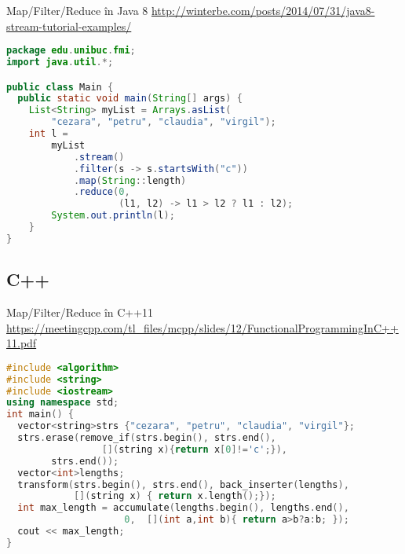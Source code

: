\documentclass[handout,xcolor=pdftex,romanian,colorlinks]{beamer}
\begin{document}
\begin{frame}[fragile]{Map/Filter/Reduce în Java 8}
{\url{http://winterbe.com/posts/2014/07/31/java8-stream-tutorial-examples/}}
\begin{lstlisting}[language=Java,basicstyle=\small]
package edu.unibuc.fmi;
import java.util.*;

public class Main {
  public static void main(String[] args) {
    List<String> myList = Arrays.asList(
        "cezara", "petru", "claudia", "virgil");
    int l =
        myList
            .stream()
            .filter(s -> s.startsWith("c"))
            .map(String::length)
            .reduce(0,
                    (l1, l2) -> l1 > l2 ? l1 : l2);
        System.out.println(l);
    }
}
\end{lstlisting}
\end{frame}



\subsection{C++}

\begin{frame}[fragile]{Map/Filter/Reduce în C++11}
{\url{https://meetingcpp.com/tl_files/mcpp/slides/12/FunctionalProgrammingInC++11.pdf}}
\begin{lstlisting}[language=C++,basicstyle=\small]
#include <algorithm>
#include <string>
#include <iostream>
using namespace std;
int main() {
  vector<string>strs {"cezara", "petru", "claudia", "virgil"};
  strs.erase(remove_if(strs.begin(), strs.end(),
                 [](string x){return x[0]!='c';}),
        strs.end());
  vector<int>lengths;   
  transform(strs.begin(), strs.end(), back_inserter(lengths), 
            [](string x) { return x.length();});
  int max_length = accumulate(lengths.begin(), lengths.end(),
                     0,  [](int a,int b){ return a>b?a:b; });     
  cout << max_length;
}
\end{lstlisting}
\end{frame}
\end{document}
